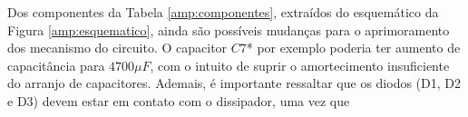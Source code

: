 \documentclass[a4paper,12pt,oneside,openany,table,xcdraw]{article}
\begin{document}
\vspace{0.4cm}
Dos componentes da Tabela \ref{amp:componentes}, extraídos do esquemático da Figura \ref{amp:esquematico}, ainda são possíveis mudanças para o aprimoramento dos mecanismo do circuito. O capacitor $C7$* por exemplo poderia ter aumento de capacitância para $4700 \mu F$, com o intuito de suprir o amortecimento insuficiente do arranjo de capacitores. %
Ademais, é importante ressaltar que os diodos (D1, D2 e D3) devem estar em contato com o dissipador, uma vez que %
\end{document}
